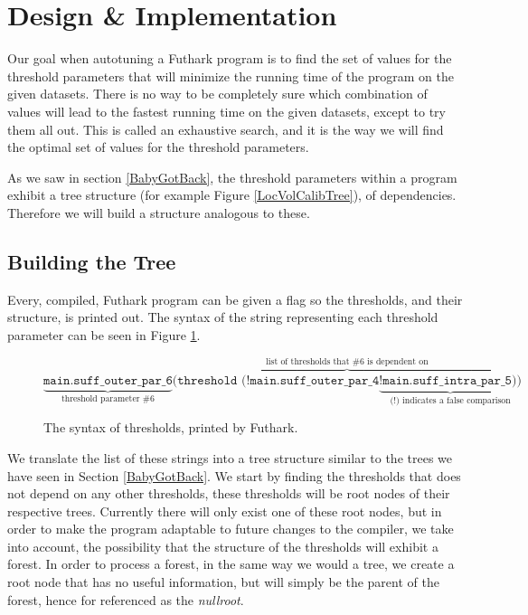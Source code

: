 \section{Design \& Implementation}

Our goal when autotuning a Futhark program is to find the set of values for the
threshold parameters that will minimize the running time of the program on the
given datasets. There is no way to be completely sure
which combination of values will lead to the fastest running time on the given
datasets, except to try them all out. This is called an exhaustive search, and
it is the way we will find the optimal set of values for the threshold
parameters. 

As we saw in section \ref{BabyGotBack}, the threshold parameters within a program exhibit a tree structure (for example Figure \ref{LocVolCalibTree}), of dependencies. Therefore we will build a structure analogous to these.
%
\subsection{Building the Tree}
Every, compiled, Futhark program can be given a flag so the thresholds, and their structure, is printed out. The syntax of the string representing each threshold parameter
can be seen in Figure \ref{thresholdSyntax}.
\begin{figure}[h]
	$$\underbrace{\texttt{main.suff\_outer\_par\_6}}_\text{threshold parameter \#6} \overbrace{\texttt{(threshold (!main.suff\_outer\_par\_4} \underbrace{\texttt{!main.suff\_intra\_par\_5))}}_\text{(!) indicates a false comparison}}^\text{list of thresholds that \#6 is dependent on}$$
	\caption{The syntax of thresholds, printed by Futhark.}
	\label{thresholdSyntax}
\end{figure}
We translate the list of these strings into a tree structure similar to the
trees we have seen in Section \ref{BabyGotBack}. 
We start by finding the thresholds that does not depend on any other thresholds, 
these thresholds will be root nodes of their respective trees.
Currently there will only exist one of these root nodes, but in order to make the program
adaptable to future changes to the compiler, we take into account, the possibility that the
structure of the thresholds will exhibit a forest. In order to process a forest, in the same way we would a tree, 
we create a root node that has no useful information, but will simply be the
parent of the forest, hence for referenced as the \textit{nullroot}. \\

